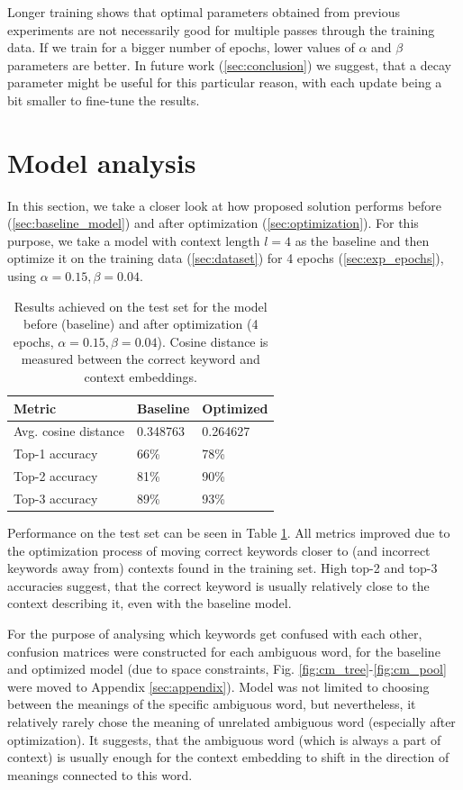 \documentclass{llncs}
\begin{document}
Longer training shows that optimal parameters obtained from previous experiments are not necessarily good for multiple passes through the training data.
If we train for a bigger number of epochs, lower values of \(\alpha\) and \(\beta\) parameters are better.
In future work (\ref{sec:conclusion}) we suggest, that a decay parameter might be useful for this particular reason, with each update being a bit smaller to fine-tune the results.


\section{Model analysis}
\label{sec:model_analysis}
In this section, we take a closer look at how proposed solution performs before (\ref{sec:baseline_model}) and after optimization (\ref{sec:optimization}).
For this purpose, we take a model with context length \(l=4\) as the baseline and then optimize it on the training data (\ref{sec:dataset}) for 4 epochs (\ref{sec:exp_epochs}), using \(\alpha=0.15, \beta=0.04\).

\begin{table}
\centering
\begin{tabular}{ | m{3cm} | m{2cm} | m{2cm} |}
    \hline
    \textbf{Metric} & \textbf{Baseline} & \textbf{Optimized} \\
    \hline
    Avg. cosine distance & 0.348763 & 0.264627 \\
    \hline
    Top-1 accuracy & 66\% & 78\% \\
    \hline
    Top-2 accuracy & 81\% & 90\% \\
    \hline
    Top-3 accuracy & 89\% & 93\% \\
    \hline
\end{tabular}
\caption{Results achieved on the test set for the model before (baseline) and after optimization (4 epochs, \(\alpha=0.15, \beta=0.04\)). Cosine distance is measured between the correct keyword and context embeddings.}
\label{table:model_analysis}
\end{table}

Performance on the test set can be seen in Table \ref{table:model_analysis}.
All metrics improved due to the optimization process of moving correct keywords closer to (and incorrect keywords away from) contexts found in the training set.
High top-2 and top-3 accuracies suggest, that the correct keyword is usually relatively close to the context describing it, even with the baseline model.

For the purpose of analysing which keywords get confused with each other, confusion matrices were constructed for each ambiguous word, for the baseline and optimized model (due to space constraints, Fig. \ref{fig:cm_tree}-\ref{fig:cm_pool} were moved to Appendix \ref{sec:appendix}).
Model was not limited to choosing between the meanings of the specific ambiguous word, but nevertheless, it relatively rarely chose the meaning of unrelated ambiguous word (especially after optimization).
It suggests, that the ambiguous word (which is always a part of context) is usually enough for the context embedding to shift in the direction of meanings connected to this word.
\end{document}
